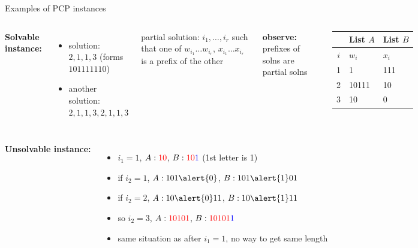 \documentclass[handout]{beamer}
\begin{document}
\begin{frame}{Examples of PCP instances}

    \begin{columns}


        \textbf{Solvable instance:}

        \begin{itemize}            
            \item solution: \alert{$2,1,1,3$} (forms $101111110$)
            \item another solution: $2,1,1,3,2,1,1,3$
        \end{itemize}

        \smallskip

        \alert{partial solution}: $i_1,\dots,i_r$ such that one of $w_{i_1} \ldots w_{i_r}$, $x_{i_1} \ldots x_{i_r}$ is a prefix of the other

        \textbf{observe:} prefixes of solns are partial solns


        \begin{tabular}{c | l | l}
            & List $A$ & List $B$\\
           \hline
           $i$ & $w_i$ & $x_i$ \\
           \hline
           1 & 1 & 111\\
           2 & 10111 & 10\\
           3 & 10 & 0 
        \end{tabular}

        \vspace{0.5cm}
    
    \end{columns}

    \begin{columns}
    

        \textbf{Unsolvable instance:}

        \begin{itemize}
            \item $i_1=1$, $A:\textcolor{red}{10}$, $B:\textcolor{red}{10}\textcolor{blue}{1}$ (1st letter is 1)
            \item if $i_2=1$, $A:101\alert{0}$, $B:101\alert{1}01$
            \item if $i_2=2$, $A:10\alert{0}11$, $B:10\alert{1}11$
            \item so $i_2=3$, $A:\textcolor{red}{10101}$, $B:\textcolor{red}{10101}\textcolor{blue}{1}$
            \item same situation as after $i_1=1$, no way to get same length
        \end{itemize}


\end{columns}
\end{frame}
\end{document}
